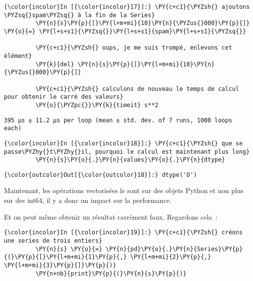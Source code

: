     \begin{Verbatim}[commandchars=\\\{\}]
{\color{incolor}In [{\color{incolor}17}]:} \PY{c+c1}{\PYZsh{} ajoutons \PYZsq{}spam\PYZsq{} à la fin de la Series}
         \PY{n}{s}\PY{p}{[}\PY{l+m+mi}{10}\PY{n}{\PYZus{}000}\PY{p}{]} \PY{o}{=} \PY{l+s+s1}{\PYZsq{}}\PY{l+s+s1}{spam}\PY{l+s+s1}{\PYZsq{}}
         
         \PY{c+c1}{\PYZsh{} oups, je me suis trompé, enlevons cet élément}
         \PY{k}{del} \PY{n}{s}\PY{p}{[}\PY{l+m+mi}{10}\PY{n}{\PYZus{}000}\PY{p}{]}
         
         \PY{c+c1}{\PYZsh{} calculons de nouveau le temps de calcul pour obtenir le carré des valeurs}
         \PY{o}{\PYZpc{}}\PY{k}{timeit} s**2
\end{Verbatim}


    \begin{Verbatim}[commandchars=\\\{\}]
395 µs ± 11.2 µs per loop (mean ± std. dev. of 7 runs, 1000 loops each)

    \end{Verbatim}

    \begin{Verbatim}[commandchars=\\\{\}]
{\color{incolor}In [{\color{incolor}18}]:} \PY{c+c1}{\PYZsh{} que se passe\PYZhy{}t\PYZhy{}il, pourquoi le calcul est maintenant plus long}
         \PY{n}{s}\PY{o}{.}\PY{n}{values}\PY{o}{.}\PY{n}{dtype}
\end{Verbatim}


\begin{Verbatim}[commandchars=\\\{\}]
{\color{outcolor}Out[{\color{outcolor}18}]:} dtype('O')
\end{Verbatim}
            
    Maintenant, les opérations vectorisées le sont sur des objets Python et
non plus sur des int64, il y a donc un impact sur la performance.

Et on peut même obtenir un résultat carrément faux. Regardons cela~:

    \begin{Verbatim}[commandchars=\\\{\}]
{\color{incolor}In [{\color{incolor}19}]:} \PY{c+c1}{\PYZsh{} créons une series de trois entiers}
         \PY{n}{s} \PY{o}{=} \PY{n}{pd}\PY{o}{.}\PY{n}{Series}\PY{p}{(}\PY{p}{[}\PY{l+m+mi}{1}\PY{p}{,} \PY{l+m+mi}{2}\PY{p}{,} \PY{l+m+mi}{3}\PY{p}{]}\PY{p}{)}
         \PY{n+nb}{print}\PY{p}{(}\PY{n}{s}\PY{p}{)}
\end{Verbatim}


